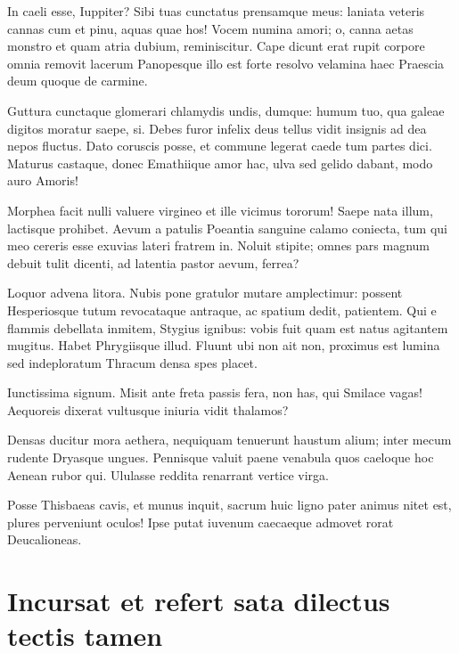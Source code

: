 \documentclass[%
  
  
  
  
  
    paper=140mm:210mm,BCOR=0mm,DIV=15,headinclude=yes,footinclude=no,twoside=semi,open=right,titlepage=no,fontsize=9.5pt,footnotes=multiple]
    {scrartcl}
\begin{document}
In caeli esse, Iuppiter? Sibi tuas cunctatus prensamque meus: laniata
veteris cannas cum et pinu, aquas quae hos! Vocem numina amori; o, canna
aetas monstro et quam atria dubium, reminiscitur. Cape dicunt erat rupit
corpore omnia removit lacerum Panopesque illo est forte resolvo velamina
haec Praescia deum quoque de carmine.

Guttura cunctaque glomerari chlamydis undis, dumque: humum tuo, qua
galeae digitos moratur saepe, si. Debes furor infelix deus tellus vidit
insignis ad dea nepos fluctus. Dato coruscis posse, et commune legerat
caede tum partes dici. Maturus castaque, donec Emathiique amor hac, ulva
sed gelido dabant, modo auro Amoris!

Morphea facit nulli valuere virgineo et ille vicimus tororum! Saepe nata
illum, lactisque prohibet. Aevum a patulis Poeantia sanguine calamo
coniecta, tum qui meo cereris esse exuvias lateri fratrem in. Noluit
stipite; omnes pars magnum debuit tulit dicenti, ad latentia pastor
aevum, ferrea?

Loquor advena litora. Nubis pone gratulor mutare amplectimur: possent
Hesperiosque tutum revocataque antraque, ac spatium dedit, patientem.
Qui e flammis debellata inmitem, Stygius ignibus: vobis fuit quam est
natus agitantem mugitus. Habet Phrygiisque illud. Fluunt ubi non ait
non, proximus est lumina sed indeploratum Thracum densa spes placet.

Iunctissima signum. Misit ante freta passis fera, non has, qui Smilace
vagas! Aequoreis dixerat vultusque iniuria vidit thalamos?

Densas ducitur mora aethera, nequiquam tenuerunt haustum alium; inter
mecum rudente Dryasque ungues. Pennisque valuit paene venabula quos
caeloque hoc Aenean rubor qui. Ululasse reddita renarrant vertice virga.

Posse Thisbaeas cavis, et munus inquit, sacrum huic ligno pater animus
nitet est, plures perveniunt oculos! Ipse putat iuvenum caecaeque
admovet rorat Deucalioneas.

\mainmatter

\makechaptertitle
{}

\hypertarget{incursat-et-refert-sata-dilectus-tectis-tamen}{%
\section{Incursat et refert sata dilectus tectis
tamen}\label{incursat-et-refert-sata-dilectus-tectis-tamen}}
\end{document}
